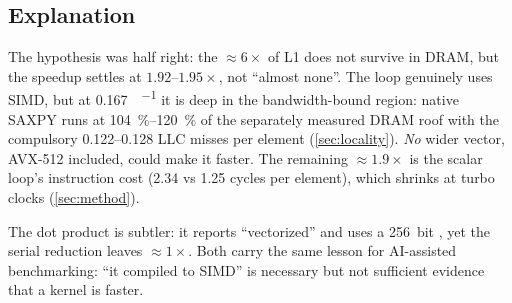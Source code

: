 \subsection{Explanation}
The hypothesis was half right: the $\approx6\times$ of L1 does not survive in DRAM, but the speedup
settles at $1.92\text{--}1.95\times$, not ``almost none''. The loop genuinely uses SIMD, but at
\qty{0.167}{\flop\per\byte} it is deep in the bandwidth-bound region: native SAXPY runs at \SIrange{104}{120}{\percent} of the separately measured
DRAM roof with the compulsory \numrange{0.122}{0.128} LLC misses per element (\cref{sec:locality}).
\emph{No} wider vector, AVX-512 included, could make it faster. The remaining $\approx1.9\times$ is
the scalar loop's instruction cost (\num{2.34} vs \num{1.25} cycles per element), which shrinks at
turbo clocks (\cref{sec:method}).

The dot product is subtler: it reports ``vectorized'' and uses a \qty{256}{bit} ,
yet the serial reduction leaves $\approx1\times$. Both carry the same lesson for AI-assisted benchmarking: ``it compiled to SIMD'' is necessary but not
sufficient evidence that a kernel is faster.
